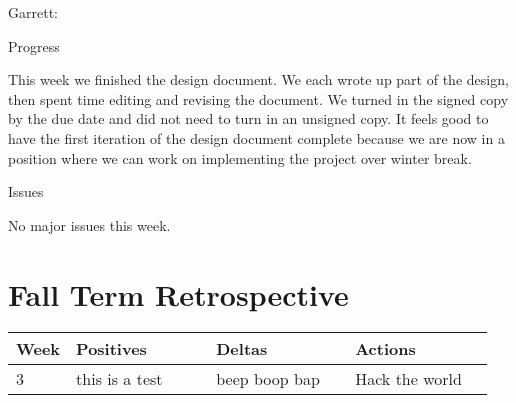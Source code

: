 \documentclass[10pt,onecolumn,journal,draftclsnofoot]{IEEEtran}
\begin{document}
Garrett:

Progress

This week we finished the design document. We each wrote up part of the design,
then spent time editing and revising the document. We turned in the signed copy
by the due date and did not need to turn in an unsigned copy. It feels good to
have the first iteration of the design document complete because we are now in a
position where we can work on implementing the project over winter break.

Issues

No major issues this week.

\section{Fall Term Retrospective}

\begin{center}
	\begin{tabular}{| p{0.05\linewidth} | p{0.3\linewidth} | p{0.3\linewidth} | p{0.3\linewidth} |}\hline
		Week & Positives & Deltas & Actions \\ \hline
		3 & this is a test  & beep boop bap & Hack the world \\ \hline
	\end{tabular}
\end{center}
\end{document}

